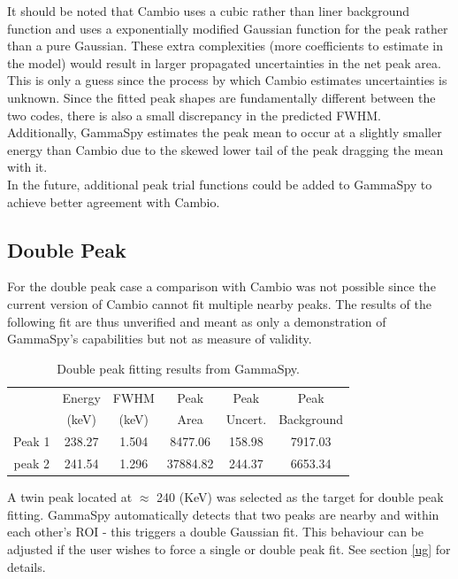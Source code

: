 \documentclass[10pt]{article}
\begin{document}
It should be noted that Cambio uses a cubic rather than liner background function and
uses a exponentially modified Gaussian function for the peak rather than a pure Gaussian.
These extra complexities (more coefficients to estimate in the model) would result in larger propagated uncertainties in the
net peak area.  This is only a guess since the process by which Cambio estimates uncertainties is unknown.
Since the fitted peak shapes are fundamentally different between the two codes, there is
also a small discrepancy in the predicted FWHM. Additionally, GammaSpy estimates the peak
mean to occur at a slightly smaller energy than Cambio due to the skewed lower tail of the peak
dragging the mean with it. \\

In the future, additional peak trial functions could be added to GammaSpy to achieve better agreement with Cambio.

\subsection{Double Peak}
For the double peak case a comparison with Cambio was not possible since the current
version of Cambio cannot fit multiple nearby peaks.  The results of the following fit
are thus unverified and meant as only a demonstration of GammaSpy's capabilities but
not as measure of validity. \\

\begin{table}[h]
\begin{center}
\begin{tabular}{|c|c|c|c|c|c|}
\hline 
   & Energy	&FWHM	&Peak	&Peak	&Peak \\
       & (keV)	&(keV)	&Area	&Uncert.	&Background\\ \hline \hline
 Peak 1&238.27 & 1.504	&  8477.06 & 158.98 & 7917.03 \\
 peak 2&241.54	& 1.296	& 37884.82  &244.37 & 6653.34 \\
\hline
\end{tabular}
\caption{Double peak fitting results from GammaSpy.}
\end{center}
\label{table_2}
\end{table}

A twin peak located at $\approx$ 240 (KeV) was selected as the target for double peak fitting.
GammaSpy automatically detects that two peaks are nearby and within each other's ROI - this triggers
a double Gaussian fit.  This behaviour can be adjusted if the user wishes to force a single or double
peak fit.  See section \ref{ug} for details.
\end{document}

